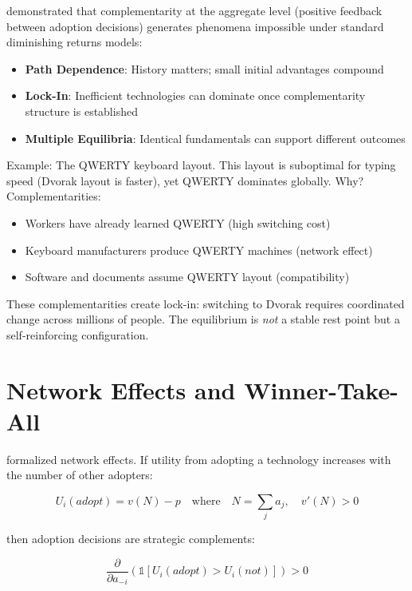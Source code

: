 \documentclass[12pt,oneside]{book}
\begin{document}
\citet{arthur1989} demonstrated that complementarity at the aggregate level (positive feedback
between adoption decisions) generates phenomena impossible under standard diminishing returns models:

\begin{itemize}
  \item \textbf{Path Dependence}: History matters; small initial advantages compound
  \item \textbf{Lock-In}: Inefficient technologies can dominate once complementarity structure is established
  \item \textbf{Multiple Equilibria}: Identical fundamentals can support different outcomes
\end{itemize}

Example: The QWERTY keyboard layout. This layout is suboptimal for typing speed (Dvorak layout
is faster), yet QWERTY dominates globally. Why? Complementarities:

\begin{itemize}
  \item Workers have already learned QWERTY (high switching cost)
  \item Keyboard manufacturers produce QWERTY machines (network effect)
  \item Software and documents assume QWERTY layout (compatibility)
\end{itemize}

These complementarities create lock-in: switching to Dvorak requires coordinated change across
millions of people. The equilibrium is \emph{not} a stable rest point but a self-reinforcing configuration.

\section{Network Effects and Winner-Take-All}

\citet{katzshapiro1985} formalized network effects. If utility from adopting a technology
increases with the number of other adopters:

\begin{equation}
U_i(adopt) = v(N) - p \quad \text{where} \quad N = \sum_j a_j, \quad v'(N) > 0
\label{eq:network}
\end{equation}

then adoption decisions are strategic complements:

\begin{equation}
\frac{\partial}{\partial a_{-i}} \left( \mathbb{1}[U_i(adopt) > U_i(not)] \right) > 0
\end{equation}
\end{document}
